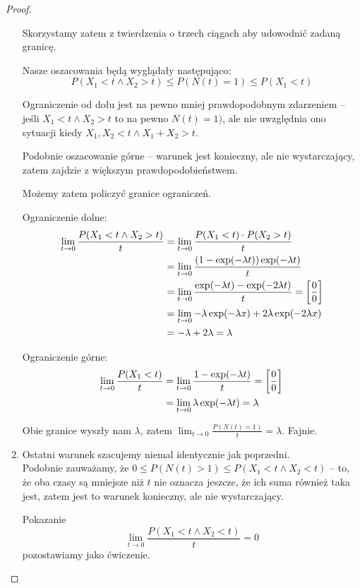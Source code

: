 \begin{proof}
\begin{enumerate}
        Skorzystamy zatem z twierdzenia o trzech ciągach aby udowodnić zadaną granicę.
        
        Nasze oszacowania będą wyglądały następująco:
        \[
            P(X_1 < t \land X_2 > t) \leq P(N(t) = 1) \leq P(X_1 < t)
        \]
        
        Ograniczenie od dołu jest na pewno mniej prawdopodobnym zdarzeniem -- jeśli \( X_1 < t \land X_2 > t \)
        to na pewno \( N(t) = 1) \), ale nie uwzględnia ono sytuacji kiedy \( X_1, X_2 < t \land X_1 + X_2 > t \).
        
        Podobnie oszacowanie górne -- warunek jest konieczny, ale nie wystarczający, zatem zajdzie z większym prawdopodobieństwem.
        
        Możemy zatem policzyć granice ograniczeń.
        
        Ograniczenie dolne:
        \begin{align*}
            \lim_{t \rightarrow 0} \frac{P(X_1 < t \land X_2 > t)}{t}
                &= \lim_{t \rightarrow 0} \frac{P(X_1 < t) \cdot P(X_2 > t)}{t} \\
                &= \lim_{t \rightarrow 0} \frac{\left(1 - \exp(-\lambda t)\right)\exp(-\lambda t)}{t} \\
                &= \lim_{t \rightarrow 0} \frac{\exp(-\lambda t) - \exp(-2\lambda t)}{t} = \left[\frac{0}{0}\right] \\ 
                &= \lim_{t \rightarrow 0} -\lambda \exp(-\lambda x) + 2\lambda \exp(-2\lambda x) \\
                &= -\lambda + 2\lambda = \lambda
        \end{align*}
        
        Ograniczenie górne:
        \begin{align*}
            \lim_{t \rightarrow 0} \frac{P(X_1 < t)}{t}
                &= \lim_{t \rightarrow 0} \frac{1 - \exp(-\lambda t)}{t} = \left[\frac{0}{0}\right] \\
                &= \lim_{t \rightarrow 0} \lambda \exp(-\lambda t) = \lambda
        \end{align*}
        
        Obie granice wyszły nam \( \lambda \), zatem \(  \lim_{t \rightarrow 0} \frac{P(N(t) = 1)}{t} = \lambda \). Fajnie.
        
    \item Ostatni warunek szacujemy niemal identycznie jak poprzedni. \\
        Podobnie zauważamy, że \( 0 \leq P(N(t) > 1) \leq P(X_1 < t \land X_2 < t) \)
        -- to, że oba czasy są mniejsze niż \( t \) nie oznacza jeszcze, że ich suma również taka jest, zatem jest to warunek konieczny, ale nie wystarczający.
        
        Pokazanie \[ \lim_{t \rightarrow 0} \frac{P(X_1 < t \land X_2 < t)}{t} = 0 \] pozostawiamy jako ćwiczenie.
        
        
        
    \end{enumerate}
\end{proof}